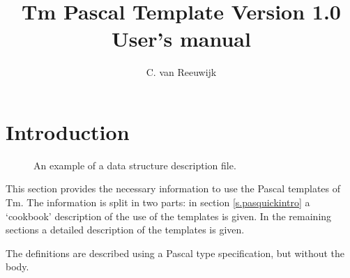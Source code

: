 \documentclass{article}
\author{C. van Reeuwijk}
\title{Tm Pascal Template Version 1.0 User's manual}
\newcommand{\Pascal}{\sf Pascal}
\newcommand{\Tm}{\sf Tm}
\begin{document}
\maketitle
\section{Introduction}
\begin{figure}[h]

\caption{\label{f.ds}An example of a data structure description file.}
\end{figure}
This section provides the necessary information to use the {\Pascal}
templates of {\Tm}.
The information is split in two parts: in section \ref{s.pasquickintro}
a `cookbook' description of the use of the templates is given.
In the remaining sections a detailed description of the templates is given.
\par
The definitions are described using a {\Pascal} type specification,
but without the body.
\end{document}
